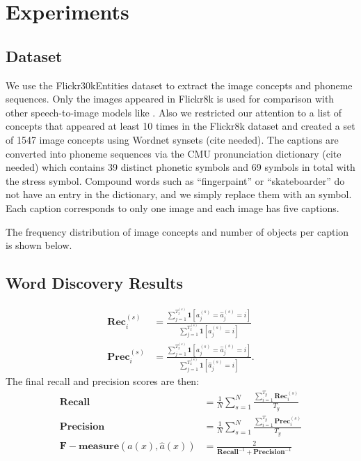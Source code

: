\documentclass[a4paper]{article}
\begin{document}

\section{Experiments}
\subsection{Dataset}
We use the Flickr30kEntities dataset to extract the image concepts and phoneme sequences. Only the images appeared in Flickr8k is used for comparison with other speech-to-image models like \cite{Harwath16-ULO}. Also we restricted our attention to a list of concepts that appeared at least 10 times in the Flickr8k dataset and created a set of 1547 image concepts using Wordnet synsets (cite needed). The captions are converted into phoneme sequences via the CMU pronunciation dictionary (cite needed) which contains 39 distinct phonetic symbols and 69 symbols in total with the stress symbol. Compound words such as ``fingerpaint'' or ``skateboarder'' do not have an entry in the dictionary, and we simply replace them with an  symbol. Each caption corresponds to only one image and each image has five captions.

The frequency distribution of image concepts and number of objects per caption is shown below. 

\subsection{Word Discovery Results}
\begin{align*}
    \mathbf{Rec}_i^{(s)} &= \frac{\sum_{j=1}^{T_x^{(s)}} \mathbf 1 [a_j^{(s)} = \hat{a}_j^{(s)} = i]}{\sum_{j=1}^{T_x^{(s)}} \mathbf 1 [a_j^{(s)} = i]}\\
    \mathbf{Prec}_i^{(s)} &= 
     \frac{\sum_{j=1}^{T_x^{(s)}} \mathbf 1 [a_j^{(s)} = \hat{a}_j^{(s)} = i]}{\sum_{j=1}^{T_x^{(s)}} \mathbf 1 [\hat{a}_j^{(s)} = i]}.
\end{align*}
The final recall and precision scores are then:
\begin{align*}
    \mathbf{Recall} &=  \frac{1}{N}\sum_{s=1}^{N}
    \frac{\sum_{i=1}^{T_y}\mathbf{Rec}_i^{(s)}}{T_y}\\
    \mathbf{Precision} &= \frac{1}{N}\sum_{s=1}^{N} \frac{\sum_{i=1}^{T_y}\mathbf{Prec}_i^{(s)}}{T_y}\\
    \mathbf{F-measure}(a(x), \hat{a}(x)) &= \frac{2}{\mathbf{Recall}^{-1}+\mathbf{Precision}^{-1}}
\end{align*}
\end{document}
